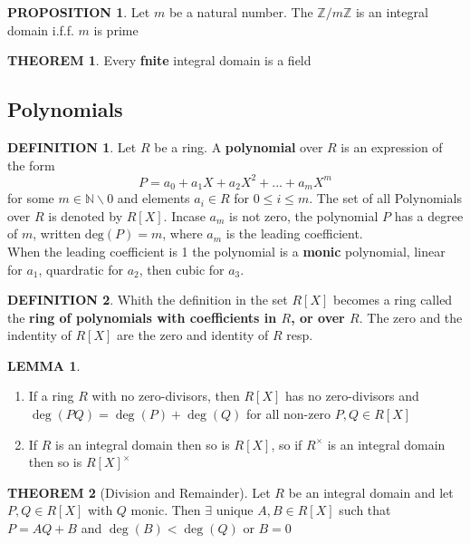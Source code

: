 \documentclass[12pt]{article}
\theoremstyle{definition}
\newtheorem{definition}{DEFINITION}[subsection]
\newtheorem{theorem}{THEOREM}[subsection]
\newtheorem{lemma}{LEMMA}[subsection]
\newtheorem{prop}{PROPOSITION}[subsection]
\begin{document}
\begin{prop}
    Let $m$ be a natural number. The $\mathbb{Z}/m\mathbb{Z}$ is an integral domain i.f.f. $m$ is prime
\end{prop}

\begin{theorem}
    Every \textbf{fnite} integral domain is a field
\end{theorem}


\subsection{Polynomials}
\begin{definition}
    Let $R$ be a ring. A \textbf{polynomial} over $R$ is an expression of the form
    $$P = a_0 + a_1X + a_2X^2 + ... + a_mX^m$$
    for some $m \in \mathbb{N}\backslash 0$ and elements $a_i \in R$ for $0 \leq i \leq m$. The set of all Polynomials over $R$ is denoted by $R[X]$. Incase $a_m$ is not zero, the polynomial $P$ has a degree of $m$, written $\text{deg}(P) = m$, where $a_m$ is the leading coefficient.\\
    When the leading coefficient is 1 the polynomial is a \textbf{monic} polynomial, linear for $a_1$, quardratic for $a_2$, then cubic for $a_3$.
\end{definition}

\begin{definition}
    Whith the definition in the set $R[X]$ becomes a ring called the \textbf{ring of polynomials with coefficients in $R$, or over $R$}. The zero and the indentity of $R[X]$ are the zero and identity of $R$ resp.
\end{definition}

\begin{lemma}
    \quad
    \begin{enumerate}
        \item If a ring $R$ with no zero-divisors, then $R[X]$ has no zero-divisors and $\deg(PQ) = \deg(P) + \deg(Q)$ for all non-zero $P,Q\in R[X]$
        \item If $R$ is an integral domain then so is $R[X]$, so if $R^\times$ is an integral domain then so is $R[X]^\times$
    \end{enumerate}
\end{lemma}

\begin{theorem}[Division and Remainder]
    Let $R$ be an integral domain and let $P,Q\in R[X]$ with $Q$ monic. Then $\exists$ unique $A,B\in R[X]$ such that $P = AQ + B$ and $\deg(B) < \deg(Q)$ or $B = 0$
\end{theorem}
\end{document}
